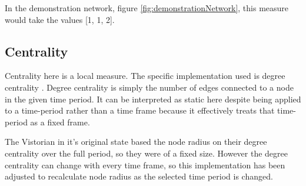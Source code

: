 In the demonstration network, figure \ref{fig:demonstrationNetwork}, this measure would take the values [1, 1, 2]. 


\subsection{Centrality}
Centrality here is a local measure. The specific implementation used is degree centrality \cite{degCent}. Degree centrality is simply the number of edges connected to a node in the given time period. It can be interpreted as static here despite being applied to a time-period rather than a time frame because it effectively treats that time-period as a fixed frame.

The Vistorian in it's original state based the node radius on their degree centrality over the full period, so they were of a fixed size. However the degree centrality can change with every time frame, so this implementation has been adjusted to recalculate node radius as the selected time period is changed.




